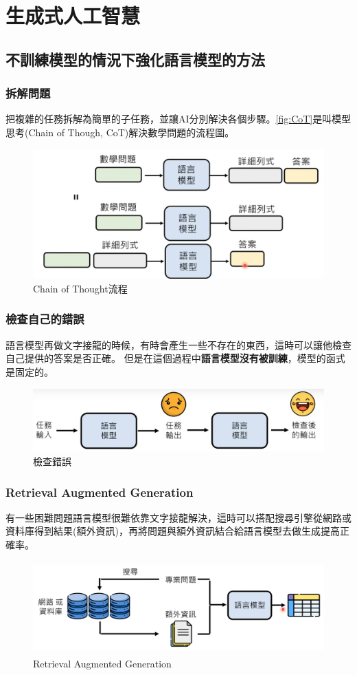 \chapter{生成式人工智慧} \label{chap:generative_ai}

\section{不訓練模型的情況下強化語言模型的方法} 
\subsection{拆解問題}
把複雜的任務拆解為簡單的子任務，並讓AI分別解決各個步驟。\autoref{fig:CoT}是叫模型思考(Chain of Though, CoT)解決數學問題的流程圖。
\begin{figure}[htbp]
    \centering
    \includegraphics[width=0.7\linewidth]{images/w13/CoT.png}
    \caption{Chain of Thought流程}
    \label{fig:CoT}
\end{figure}
\subsection{檢查自己的錯誤}
語言模型再做文字接龍的時候，有時會產生一些不存在的東西，這時可以讓他檢查自己提供的答案是否正確。
但是在這個過程中\textbf{語言模型沒有被訓練}，模型的函式是固定的。
\begin{figure}[htbp]
    \centering
    \includegraphics[width=0.7\linewidth]{images/w13/mistake.png}
    \caption{檢查錯誤}
    \label{fig:w13-mistake}
\end{figure}
\subsection{Retrieval Augmented Generation}
有一些困難問題語言模型很難依靠文字接龍解決，這時可以搭配搜尋引擎從網路或資料庫得到結果(額外資訊)，再將問題與額外資訊結合給語言模型去做生成提高正確率。
\begin{figure}
    \centering
    \includegraphics[width=0.7\linewidth]{images/w13/RAG.png}
    \caption{Retrieval Augmented Generation}
    \label{fig:w13-RAG}
\end{figure}
